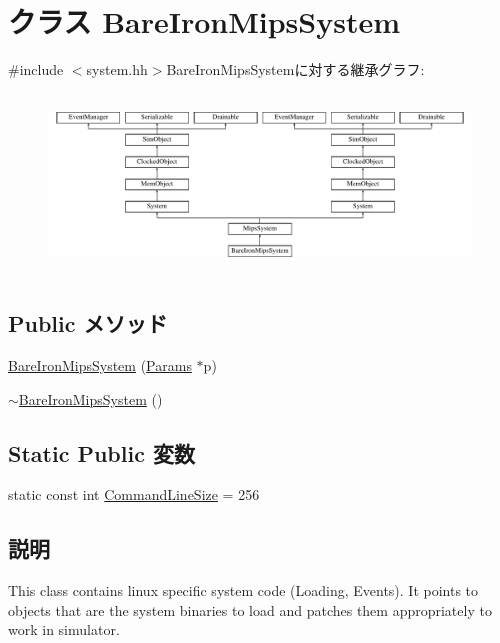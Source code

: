 \hypertarget{classBareIronMipsSystem}{
\section{クラス BareIronMipsSystem}
\label{classBareIronMipsSystem}
}


{\ttfamily \#include $<$system.hh$>$}BareIronMipsSystemに対する継承グラフ:\begin{figure}[H]
\begin{center}
\leavevmode
\includegraphics[height=4.80392cm]{classBareIronMipsSystem}
\end{center}
\end{figure}
\subsection*{Public メソッド}
\begin{DoxyCompactItemize}
\item 
\hyperlink{classBareIronMipsSystem_a213e0c64cf8e02084aa021bb7b9a6462}{BareIronMipsSystem} (\hyperlink{classMipsSystem_acf01be080284e8262bc1ff41fbd1710c}{Params} $\ast$p)
\item 
\hyperlink{classBareIronMipsSystem_aa8cc64ec6f555ee5cf4286851071e0c0}{$\sim$BareIronMipsSystem} ()
\end{DoxyCompactItemize}
\subsection*{Static Public 変数}
\begin{DoxyCompactItemize}
\item 
static const int \hyperlink{classBareIronMipsSystem_a40cf7cde1351c066dee545df2832e4c7}{CommandLineSize} = 256
\end{DoxyCompactItemize}


\subsection{説明}
This class contains linux specific system code (Loading, Events). It points to objects that are the system binaries to load and patches them appropriately to work in simulator. 

